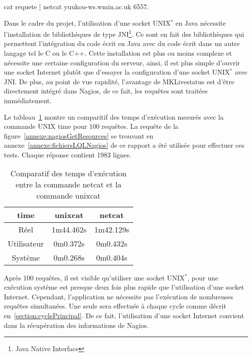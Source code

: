 \begin{center}
	\textsf{cat requete | netcat yuukou-ws.wmin.ac.uk 6557}.

\end{center}

Dans le cadre du projet, l'utilisation d'une socket UNIX$^*$ en Java n\'ecessite l'installation de biblioth\`eques de type JNI\protect\footnote{Java Native Interface}.
Ce sont en fait des biblioth\`eques qui permettent l'int\'egration du code \'ecrit en Java avec du code \'ecrit dans un autre langage tel le C ou le C++.
Cette installation est plus ou moins complexe et n\'ecessite une certaine configuration du serveur, ainsi, il est plus simple d'ouvrir une socket Internet plut\^ot que d'essayer la configuration d'une socket UNIX$^*$ avec JNI.
De plus, au point de vue rapidit\'e, l'avantage de MKLivestatus est d'\^etre directement int\'egr\'e dans Nagios, de ce fait, les requ\^etes sont trait\'ees imm\'ediatement.

Le tableau~\ref{table:comparatifTemps} montre un comparitif des temps d'ex\'ecution mesur\'es avec la commande UNIX \textsf{time} pour 100 requ\^etes.
La requ\^ete de la figure~\ref{annexe:nagiosGetResources} se trouvant en annexe~\ref{annexe:fichiersLQLNagios} de ce rapport a \'et\'e utilis\'ee pour effectuer ces tests.
Chaque r\'eponse contient 1983 lignes.

\begin{table}[!ht]
	\centering
	\begin{tabular}{|>{\columncolor{grisclair}}c|c|c|}
		\hline
		\rowcolor{grisclair} \textbf{time} & \textbf{unixcat} & \textbf{netcat}\\
		\hline
		R\'eel & 1m44.462s & 1m42.129s\\
		\hline
		Utilisateur & 0m0.372s & 0m0.432s\\
		\hline
		Syst\`eme & 0m0.268s & 0m0.404s\\
		\hline

	\end{tabular}

	\caption{Comparatif des temps d'ex\'ecution entre la commande \textsf{netcat} et la commande \textsf{unixcat}}
	\label{table:comparatifTemps}

\end{table}

Apr\`es 100 requ\^etes, il est visible qu'utiliser une socket UNIX$^*$, pour une ex\'ecution syst\`eme est presque deux fois plus rapide que l'utilisation d'une socket Internet.
Cependant, l'application ne n\'ecessite pas l'ex\'ecution de nombreuses requ\^etes simultan\'ees.
Une seule sera effectu\'ee \`a chaque cycle comme d\'ecrit en~\ref{section:cyclePrincipal}.
De ce fait, l'utilisation d'une socket Internet convient dans la r\'ecup\'eration des informations de Nagios.

